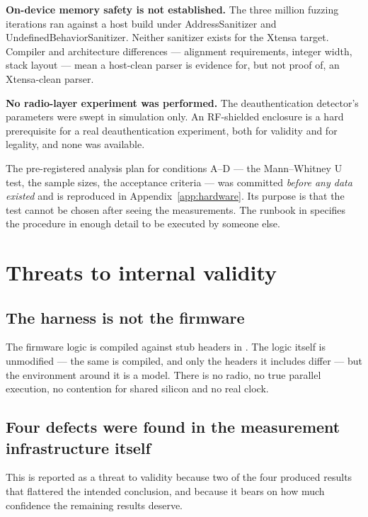 \textbf{On-device memory safety is not established.} The three million fuzzing iterations ran
against a host build under AddressSanitizer and UndefinedBehaviorSanitizer. Neither sanitizer
exists for the Xtensa target. Compiler and architecture differences --- alignment requirements,
integer width, stack layout --- mean a host-clean parser is evidence for, but not proof of, an
Xtensa-clean parser.

\textbf{No radio-layer experiment was performed.} The deauthentication detector's parameters were
swept in simulation only. An RF-shielded enclosure is a hard prerequisite for a real
deauthentication experiment, both for validity and for legality, and none was available.

The pre-registered analysis plan for conditions A--D --- the Mann--Whitney U test, the sample
sizes, the acceptance criteria --- was committed \emph{before any data existed} and is reproduced
in Appendix~\ref{app:hardware}. Its purpose is that the test cannot be chosen after seeing the
measurements. The runbook in  specifies the procedure in
enough detail to be executed by someone else.

\section{Threats to internal validity}

\subsection{The harness is not the firmware}

The firmware logic is compiled against stub headers in . The logic itself
is unmodified --- the same  is compiled, and only the headers it includes
differ --- but the environment around it is a model. There is no radio, no true parallel
execution, no contention for shared silicon and no real clock.

\subsection{Four defects were found in the measurement infrastructure itself}

This is reported as a threat to validity because two of the four produced results that flattered
the intended conclusion, and because it bears on how much confidence the remaining results
deserve.


